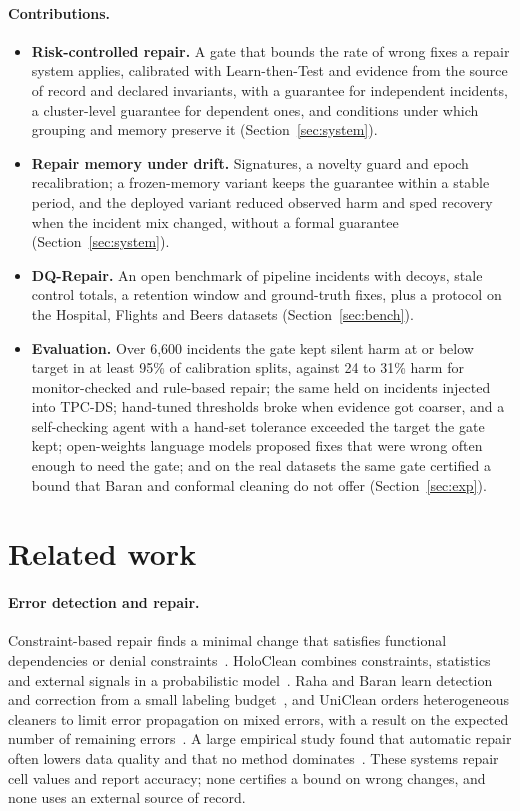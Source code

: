 \paragraph{Contributions.}
\begin{itemize}
\item \textbf{Risk-controlled repair.} A gate that bounds the rate of wrong fixes a repair system applies, calibrated with Learn-then-Test and evidence from the source of record and declared invariants, with a guarantee for independent incidents, a cluster-level guarantee for dependent ones, and conditions under which grouping and memory preserve it (Section~\ref{sec:system}).
\item \textbf{Repair memory under drift.} Signatures, a novelty guard and epoch recalibration; a frozen-memory variant keeps the guarantee within a stable period, and the deployed variant reduced observed harm and sped recovery when the incident mix changed, without a formal guarantee (Section~\ref{sec:system}).
\item \textbf{DQ-Repair.} An open benchmark of pipeline incidents with decoys, stale control totals, a retention window and ground-truth fixes, plus a protocol on the Hospital, Flights and Beers datasets (Section~\ref{sec:bench}).
\item \textbf{Evaluation.} Over 6{,}600 incidents the gate kept silent harm at or below target in at least 95\% of calibration splits, against 24 to 31\% harm for monitor-checked and rule-based repair; the same held on incidents injected into TPC-DS; hand-tuned thresholds broke when evidence got coarser, and a self-checking agent with a hand-set tolerance exceeded the target the gate kept; open-weights language models proposed fixes that were wrong often enough to need the gate; and on the real datasets the same gate certified a bound that Baran and conformal cleaning do not offer (Section~\ref{sec:exp}).
\end{itemize}

\section{Related work}
\label{sec:related}

\paragraph{Error detection and repair.} Constraint-based repair finds a minimal change that satisfies functional dependencies or denial constraints~\cite{bohannon2005cost,chu2013holistic,cong2007improving}. HoloClean combines constraints, statistics and external signals in a probabilistic model~\cite{rekatsinas2017holoclean}. Raha and Baran learn detection and correction from a small labeling budget~\cite{mahdavi2019raha,mahdavi2020baran}, and UniClean orders heterogeneous cleaners to limit error propagation on mixed errors, with a result on the expected number of remaining errors~\cite{ding2025uniclean}. A large empirical study found that automatic repair often lowers data quality and that no method dominates~\cite{ni2024ready}. These systems repair cell values and report accuracy; none certifies a bound on wrong changes, and none uses an external source of record.

